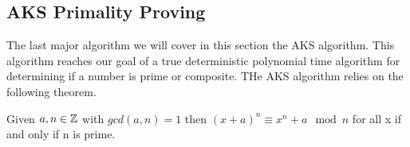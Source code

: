 \documentclass{article}
\begin{document}

\subsection{AKS Primality Proving}
The last major algorithm we will cover in this section the AKS algorithm. This algorithm reaches our goal of a true deterministic polynomial time algorithm for determining if a number is prime or composite. THe AKS algorithm relies on the following theorem.
\begin{theorem}
    \label{aks1}
    Given  $a, n \in \mathbb{Z}$ with $gcd(a,n) = 1$ then $(x + a )^n \equiv x^n +a \mod n$ for all x if and only if n is prime. 
\end{theorem}
\end{document}
